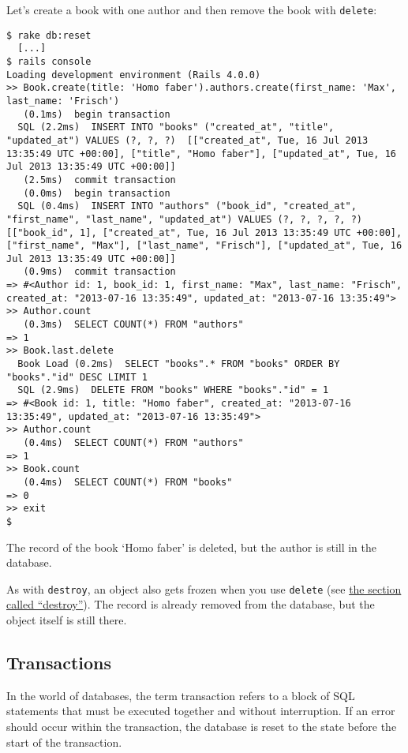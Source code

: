 \documentclass[a4paper]{book}
\newcounter{tab}[chapter]
\begin{document}
Let's create a book with one author and then remove the book with \texttt{delete}:

\begin{shaded}\begin{verbatim}
$ rake db:reset
  [...]
$ rails console
Loading development environment (Rails 4.0.0)
>> Book.create(title: 'Homo faber').authors.create(first_name: 'Max', last_name: 'Frisch')
   (0.1ms)  begin transaction
  SQL (2.2ms)  INSERT INTO "books" ("created_at", "title", "updated_at") VALUES (?, ?, ?)  [["created_at", Tue, 16 Jul 2013 13:35:49 UTC +00:00], ["title", "Homo faber"], ["updated_at", Tue, 16 Jul 2013 13:35:49 UTC +00:00]]
   (2.5ms)  commit transaction
   (0.0ms)  begin transaction
  SQL (0.4ms)  INSERT INTO "authors" ("book_id", "created_at", "first_name", "last_name", "updated_at") VALUES (?, ?, ?, ?, ?)  [["book_id", 1], ["created_at", Tue, 16 Jul 2013 13:35:49 UTC +00:00], ["first_name", "Max"], ["last_name", "Frisch"], ["updated_at", Tue, 16 Jul 2013 13:35:49 UTC +00:00]]
   (0.9ms)  commit transaction
=> #<Author id: 1, book_id: 1, first_name: "Max", last_name: "Frisch", created_at: "2013-07-16 13:35:49", updated_at: "2013-07-16 13:35:49">
>> Author.count
   (0.3ms)  SELECT COUNT(*) FROM "authors"
=> 1
>> Book.last.delete
  Book Load (0.2ms)  SELECT "books".* FROM "books" ORDER BY "books"."id" DESC LIMIT 1
  SQL (2.9ms)  DELETE FROM "books" WHERE "books"."id" = 1
=> #<Book id: 1, title: "Homo faber", created_at: "2013-07-16 13:35:49", updated_at: "2013-07-16 13:35:49">
>> Author.count
   (0.4ms)  SELECT COUNT(*) FROM "authors"
=> 1
>> Book.count
   (0.4ms)  SELECT COUNT(*) FROM "books"
=> 0
>> exit
$
\end{verbatim}\end{shaded}

The record of the book `Homo faber' is deleted, but the author is still in the database.

As with \texttt{destroy}, an object also gets frozen when you use \texttt{delete} (see \hyperref[activerecordux5fdestroy]{the section called “destroy”}). The record is already removed from the database, but the object itself is still there.

\subsection{Transactions}\label{transactions}

In the world of databases, the term transaction refers to a block of SQL statements that must be executed together and without interruption. If an error should occur within the transaction, the database is reset to the state before the start of the transaction.
\end{document}
